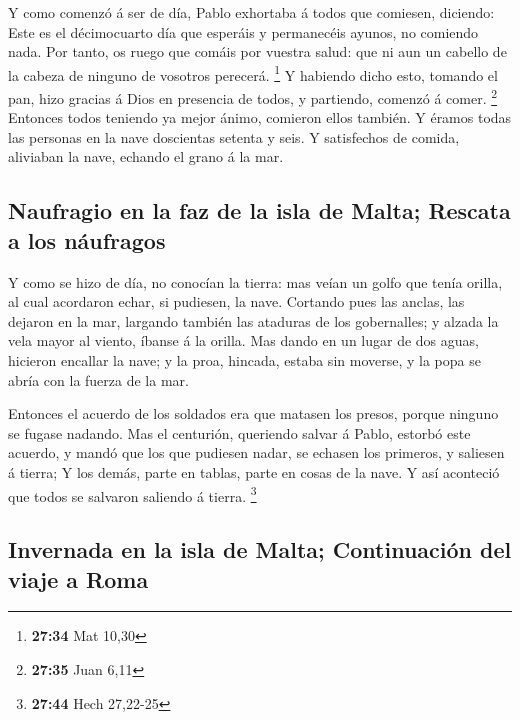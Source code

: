  Y como comenzó á ser de día, Pablo exhortaba á todos que
comiesen, diciendo: Este es el décimocuarto día que esperáis y
permanecéis ayunos, no comiendo nada.  Por tanto, os ruego
que comáis por vuestra salud: que ni aun un cabello de la cabeza de
ninguno de vosotros perecerá. \footnote{\textbf{27:34} Mat 10,30}
 Y habiendo dicho esto, tomando el pan, hizo gracias á Dios
en presencia de todos, y partiendo, comenzó á comer. \footnote{\textbf{27:35}
  Juan 6,11}  Entonces todos teniendo ya mejor ánimo,
comieron ellos también.  Y éramos todas las personas en la
nave doscientas setenta y seis.  Y satisfechos de comida,
aliviaban la nave, echando el grano á la mar.

\hypertarget{naufragio-en-la-faz-de-la-isla-de-malta-rescata-a-los-nuxe1ufragos}{%
\subsection{Naufragio en la faz de la isla de Malta; Rescata a los
náufragos}\label{naufragio-en-la-faz-de-la-isla-de-malta-rescata-a-los-nuxe1ufragos}}

 Y como se hizo de día, no conocían la tierra: mas veían un
golfo que tenía orilla, al cual acordaron echar, si pudiesen, la nave.
 Cortando pues las anclas, las dejaron en la mar, largando
también las ataduras de los gobernalles; y alzada la vela mayor al
viento, íbanse á la orilla.  Mas dando en un lugar de dos
aguas, hicieron encallar la nave; y la proa, hincada, estaba sin
moverse, y la popa se abría con la fuerza de la mar.

 Entonces el acuerdo de los soldados era que matasen los
presos, porque ninguno se fugase nadando.  Mas el
centurión, queriendo salvar á Pablo, estorbó este acuerdo, y mandó que
los que pudiesen nadar, se echasen los primeros, y saliesen á tierra;
 Y los demás, parte en tablas, parte en cosas de la nave. Y
así aconteció que todos se salvaron saliendo á tierra. \footnote{\textbf{27:44}
  Hech 27,22-25}

\hypertarget{invernada-en-la-isla-de-malta-continuaciuxf3n-del-viaje-a-roma}{%
\subsection{Invernada en la isla de Malta; Continuación del viaje a
Roma}\label{invernada-en-la-isla-de-malta-continuaciuxf3n-del-viaje-a-roma}}

